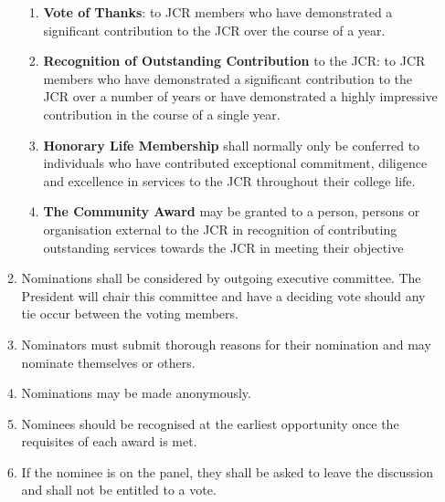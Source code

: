 \begin{enumerate}
\begin{enumerate}
        \begin{enumerate}
            \item \textbf{Vote of Thanks}: to JCR members who have demonstrated a significant contribution
            to the JCR over the course of a year.
            \item \textbf{Recognition of Outstanding Contribution} to the JCR: to JCR members who have
            demonstrated a significant contribution to the JCR over a number of years or have
            demonstrated a highly impressive contribution in the course of a single year.
            \item \textbf{Honorary Life Membership} shall normally only be conferred to individuals who have
            contributed exceptional commitment, diligence and excellence in services to the JCR
            throughout their college life.
            \item \textbf{The Community Award} may be granted to a person, persons or organisation external
            to the JCR in recognition of contributing outstanding services towards the JCR in
            meeting their objective
        \end{enumerate}
       \item Nominations shall be considered by outgoing executive committee. The President will chair this committee and have a deciding vote should any tie occur between the voting members.
        \item Nominators must submit thorough reasons for their nomination and may nominate themselves or others. 
        \item Nominations may be made anonymously.
        \item Nominees should be recognised at the earliest opportunity once the requisites of each award is met.
        \item If the nominee is on the panel, they shall be asked to leave the discussion and shall not be entitled to a vote.

    \end{enumerate}
\end{enumerate}

